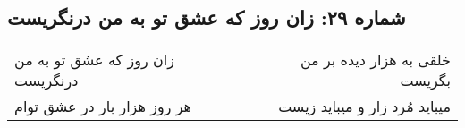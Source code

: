 \begin{center}
\section*{شماره ۲۹: زان روز که عشق تو به من درنگریست}
\label{sec:029}
\begin{longtable}{l p{0.5cm} r}
زان روز که عشق تو به من درنگریست
&&
خلقی به هزار دیده بر من بگریست
\\
هر روز هزار بار در عشق توام
&&
میباید مُرد زار و میباید زیست
\\
\end{longtable}
\end{center}
